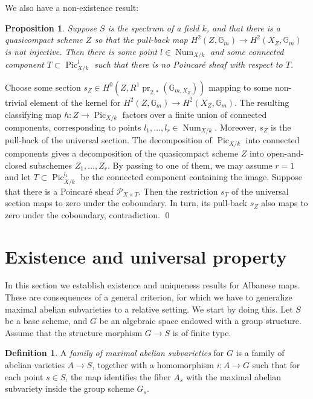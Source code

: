 \documentclass[oneside, 12pt]{amsart}
\newcommand\mylabel[1]{\label{#1}\marginpar{\raggedright\vspace{-1ex}\medskip\medskip\footnotesize \tt #1}}
\renewcommand\mylabel[1]{\label{#1}}
\newtheorem{proposition}[theorem]{Proposition}
\theoremstyle{definition}
\newtheorem{definition}[theorem]{Definition}
\theoremstyle{remark}
\newcommand{\GG}{\mathbb{G}}
\newcommand{\shP}{\mathscr{P}}
\newcommand{\Num}{\operatorname{Num}}
\newcommand{\Pic}{\operatorname{Pic}}
\newcommand{\pr}{\operatorname{pr}}
\newcommand{\ra}{\rightarrow}
\begin{document}
\medskip 
We also have a non-existence result: 

\begin{proposition}
\mylabel{against poincare}
Suppose $S$ is the spectrum of a field $k$, and that there is a quasicompact scheme $Z$ 
so that the     pull-back map   $H^2(Z,\GG_m)\ra H^2(X_Z,\GG_m)$ is not injective.
Then there is some point $l\in\Num_{X/k}$ and some connected component
$T\subset \Pic^l_{X/k}$ such that there is no Poincar\'e sheaf with respect to $T$. 
\end{proposition}

\proof
Choose some section $s_Z\in H^0(Z,R^1\pr_{2,*}(\GG_{m,X_Z}))$ mapping to some non-trivial
element of the kernel for $H^2(Z,\GG_m)\ra H^2(X_Z,\GG_m)$. The resulting classifying map  $h:Z\ra \Pic_{X/k}$
factors over a finite union of connected components, corresponding to points $l_1,\ldots,l_r\in \Num_{X/k}$.
Moreover, $s_Z$ is the pull-back of the universal section.
The decomposition of $\Pic_{X/k}$ into connected components
gives a decomposition of the quasicompact scheme $Z$ into open-and-closed subschemes $Z_1,\ldots,Z_r$. By passing to  
one of them, we may assume $r=1$ and  let $T\subset \Pic^{l_1}_{X/k}$ be the connected component containing the image. 
Suppose that there is a Poincar\'e sheaf 
$\shP_{X\times T}$. Then the restriction $s_T$ of the universal section maps to zero under
the coboundary. In turn, its pull-back $s_Z$ also maps to zero under the coboundary, contradiction.
\qed


\section{Existence and universal property}
\mylabel{Existence}

In this section we establish     existence and uniqueness results for Albanese maps.
These are consequences of a  general criterion, for which we have to generalize   maximal abelian subvarieties
to a relative setting. We start by doing this. Let $S$ be  a base scheme, and 
$G$ be an algebraic space endowed with a group structure. Assume that the structure morphism $G\ra S$ is of finite type.

\begin{definition}
\mylabel{family abelian subvarieties}
A \emph{family   of maximal abelian subvarieties} for $G$ is a family of abelian varieties $A\ra S$,
together with a homomorphism $i: A\ra G$ such that for each point $s\in S$,
the map  identifies the fiber  $A_s$ with the maximal abelian subvariety 
inside the group scheme $G_s$.
\end{definition}
\end{document}
